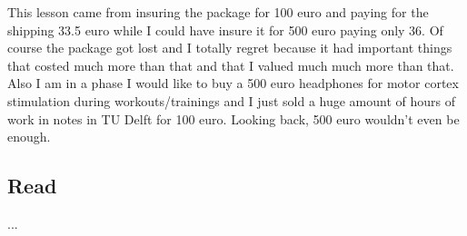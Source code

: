 This lesson came from insuring the package for 100 euro and paying for the shipping 33.5 euro while I could have insure it for 500 euro paying only 36. Of course the package got lost and I totally regret because it had important things that costed much more than that and that I valued much much more than that. Also I am in a phase I would like to buy a 500 euro headphones for motor cortex stimulation during workouts/trainings and I just sold a huge amount of hours of work in notes in TU Delft for 100 euro. Looking back, 500 euro wouldn't even be enough.

\begin{center}
\end{center}



\subsection{Read}

...
























